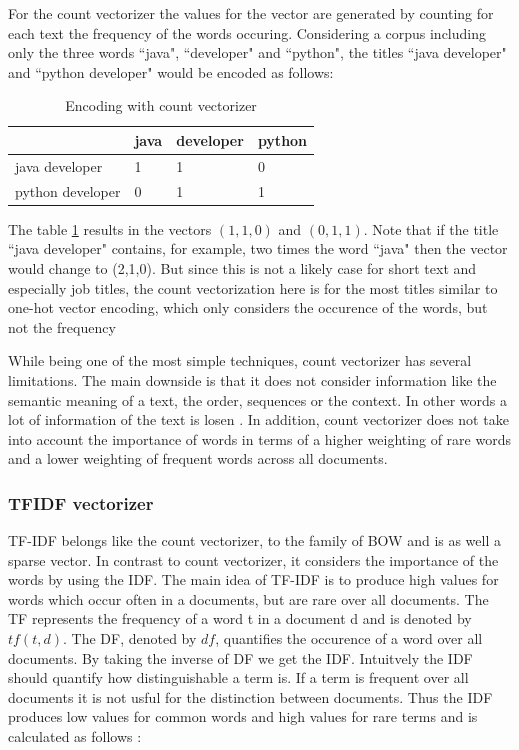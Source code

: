 \documentclass[12pt, a4paper, titlepage]{article}
\begin{document}
For the count vectorizer the values for the vector are generated by counting for each text the frequency of the words occuring. Considering a corpus including only the three words ``java", ``developer" and ``python", the titles ``java developer" and ``python developer" would be encoded as follows: 


\begin{table}[hb!]
\center
  \begin{tabular}{llll}
  \hline
                   & java & developer & python \\ \hline
  java developer   & 1    & 1         & 0      \\
  python developer & 0    & 1         & 1      \\ \hline
  \end{tabular}
  \caption{\label{tab: T11} Encoding with count vectorizer}
  \end{table}

The table \ref{tab: T11} results in the vectors $(1,1,0)$ and $(0,1,1)$. Note that if the title ``java developer" contains, for example, two times the word ``java" then the vector would change to (2,1,0). But since this is not a likely case for short text and especially job titles, the count vectorization here is for the most titles similar to one-hot vector encoding, which only considers the occurence of the words, but not the frequency \citep{kulkarni2021, sarkar2016}

While being one of the most simple techniques, count vectorizer has several limitations. The main downside is that it does not consider information like the semantic meaning of a text, the order, sequences or the context. In other words a lot of information of the text is losen \citep{sarkar2016}. In addition, count vectorizer does not take into account the importance of words in terms of a higher weighting of rare words and a lower weighting of frequent words across all documents. \citep{suleymanov2019}

\subsubsection{TFIDF vectorizer}
\ac{TF-IDF} belongs like the count vectorizer, to the family of \ac{BOW} and is as well a sparse vector. In contrast to count vectorizer, it considers the importance of the words by using the \ac{IDF}. The main idea of \ac{TF-IDF} is to produce high values for words which occur often in a documents, but are rare over all documents. The \ac{TF} represents the frequency of a word t in a document d and is denoted by $tf(t,d)$. The \ac{DF}, denoted by $df$, quantifies the occurence of a word over all documents. By taking the inverse of \ac{DF} we get the \ac{IDF}. Intuitvely the \ac{IDF} should quantify how distinguishable a term is. If a term is frequent over all documents it is not usful for the distinction between documents. Thus the \ac{IDF} produces low values for common words and high values for rare terms and is calculated as follows \citep{sidorov2019, kuang2010}: 
\end{document}
